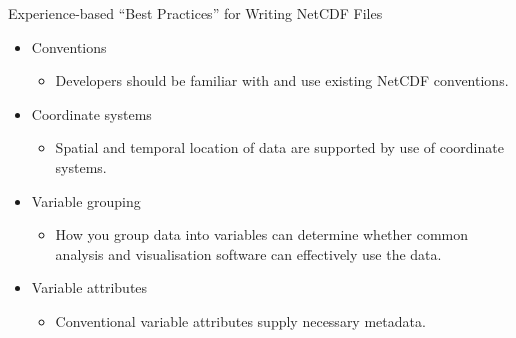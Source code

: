 \documentclass[compress,11pt,xcolor=svgnames,aspectratio=169]{beamer}
\begin{document}
\begin{frame}[fragile]{Experience-based ``Best Practices'' for Writing NetCDF Files}

    \begin{itemize}
    \setlength\itemsep{0.4cm}

        \item	Conventions
        \begin{itemize}
          \item Developers should be familiar with and use existing NetCDF conventions.
        \end{itemize}

        \item	Coordinate systems
        \begin{itemize}
          \item Spatial and temporal location of data are supported by use of coordinate systems.
        \end{itemize}

        \item	Variable grouping
        \begin{itemize}
          \item How you group data into variables can determine whether common analysis and visualisation software can effectively use the data.
        \end{itemize}

        \item	Variable attributes
        \begin{itemize}
          \item Conventional variable attributes supply necessary metadata.
        \end{itemize}

    \end{itemize}

\nocite{netcdf}

\end{frame}
\end{document}
